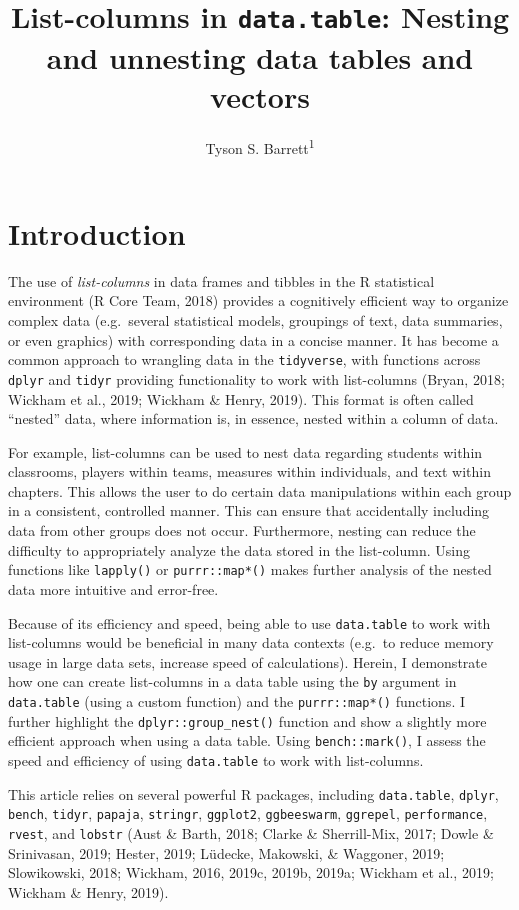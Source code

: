 \documentclass[doc,floatsintext]{apa6}
\title{List-columns in \texttt{data.table}: Nesting and unnesting data tables and vectors}
\author{Tyson S. Barrett\textsuperscript{1}}
\date{}
\affiliation{
\vspace{0.5cm}
\textsuperscript{1} Utah State University}
\begin{document}
\maketitle

\hypertarget{introduction}{%
\section{Introduction}\label{introduction}}

The use of \emph{list-columns} in data frames and tibbles in the R statistical environment (R Core Team, 2018) provides a cognitively efficient way to organize complex data (e.g.~several statistical models, groupings of text, data summaries, or even graphics) with corresponding data in a concise manner. It has become a common approach to wrangling data in the \texttt{tidyverse}, with functions across \texttt{dplyr} and \texttt{tidyr} providing functionality to work with list-columns (Bryan, 2018; Wickham et al., 2019; Wickham \& Henry, 2019). This format is often called \enquote{nested} data, where information is, in essence, nested within a column of data.

For example, list-columns can be used to nest data regarding students within classrooms, players within teams, measures within individuals, and text within chapters. This allows the user to do certain data manipulations within each group in a consistent, controlled manner. This can ensure that accidentally including data from other groups does not occur. Furthermore, nesting can reduce the difficulty to appropriately analyze the data stored in the list-column. Using functions like \texttt{lapply()} or \texttt{purrr::map*()} makes further analysis of the nested data more intuitive and error-free.

Because of its efficiency and speed, being able to use \texttt{data.table} to work with list-columns would be beneficial in many data contexts (e.g.~to reduce memory usage in large data sets, increase speed of calculations). Herein, I demonstrate how one can create list-columns in a data table using the \texttt{by} argument in \texttt{data.table} (using a custom function) and the \texttt{purrr::map*()} functions. I further highlight the \texttt{dplyr::group\_nest()} function and show a slightly more efficient approach when using a data table. Using \texttt{bench::mark()}, I assess the speed and efficiency of using \texttt{data.table} to work with list-columns.

This article relies on several powerful R packages, including \texttt{data.table}, \texttt{dplyr}, \texttt{bench}, \texttt{tidyr}, \texttt{papaja}, \texttt{stringr}, \texttt{ggplot2}, \texttt{ggbeeswarm}, \texttt{ggrepel}, \texttt{performance}, \texttt{rvest}, and \texttt{lobstr} (Aust \& Barth, 2018; Clarke \& Sherrill-Mix, 2017; Dowle \& Srinivasan, 2019; Hester, 2019; Lüdecke, Makowski, \& Waggoner, 2019; Slowikowski, 2018; Wickham, 2016, 2019c, 2019b, 2019a; Wickham et al., 2019; Wickham \& Henry, 2019).
\end{document}

